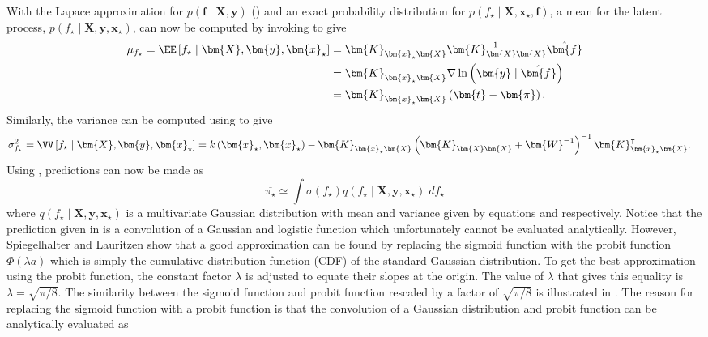 With the Lapace approximation for $p \left( \bm{f} \mid \bm{X} , \bm{y} \right)$ () and an exact probability distribution for $p \left( f_{\star} \mid \bm{X} , \bm{x}_{\star}, \bm{f} \right)$, a mean for the latent process, $p \left( f_{\star} \mid \bm{X} , \bm{y} , \bm{x}_{\star} \right)$, can now be computed by invoking   to give
\begin{align}
    \mu_{f_{\star}} = \EE \left[ f_{\star} \mid \bm{X} , \bm{y} , \bm{x}_{\star} \right]
     & = \bm{K}_{\bm{x}_{\star} \bm{X}} \bm{K}_{\bm{X} \bm{X}}^{-1} \hat{\bm{f}}           \nonumber               \\
     & = \bm{K}_{\bm{x}_{\star} \bm{X}} \nabla \ln \left( \bm{y} \mid \hat{\bm{f}} \right) \nonumber               \\
     & = \bm{K}_{\bm{x}_{\star} \bm{X}} \left( \bm{t} - \bm{\pi} \right) \label{eq: latent-process-mean-apprx-1} .
\end{align}
Similarly, the variance can be computed using  to give
\begin{align} \label{eq: latent-process-var-apprx-1}
    \sigma_{f_{\star}}^2 = \VV \left[ f_{\star} \mid \bm{X} , \bm{y} , \bm{x}_{\star} \right]
     & = k \left( \bm{x}_{\star} , \bm{x}_{\star} \right) - \bm{K}_{\bm{x}_{\star} \bm{X}} \left( \bm{K}_{\bm{X} \bm{X}} + \bm{W}^{-1} \right)^{-1} \bm{K}_{\bm{x}_{\star} \bm{X}}^{\intercal}.
\end{align}
Using , predictions can now be made as
\begin{equation} \label{eq: pred-apprx-1}
    \overline{\pi_{\star}} \simeq \int \sigma \left( f_{\star} \right) q \left( f_{\star} \mid \bm{X} , \bm{y} , \bm{x}_{\star} \right) \; d f_{\star}
\end{equation}
where $q \left( f_{\star} \mid \bm{X} , \bm{y} , \bm{x}_{\star} \right)$ is a multivariate Gaussian distribution with mean and variance given by equations  and respectively. Notice that the prediction given in  is a convolution of a Gaussian and logistic function which unfortunately cannot be evaluated analytically. However, Spiegelhalter and Lauritzen \cite{spiegelhalter1990sequential} show that a good approximation can be found by replacing the sigmoid function with the probit function $\Phi \left( \lambda a \right)$ which is simply the cumulative distribution function (CDF) of the standard Gaussian distribution. To get the best approximation using the probit function, the constant factor $\lambda$ is adjusted to equate their slopes at the origin. The value of $\lambda$ that gives this equality is $\lambda = \sqrt{\pi / 8}$. The similarity between the sigmoid function and probit function rescaled by a factor of $\sqrt{\pi / 8}$ is illustrated in . The reason for replacing the sigmoid function with a probit function is that the convolution of a Gaussian distribution and probit function can be analytically evaluated as
